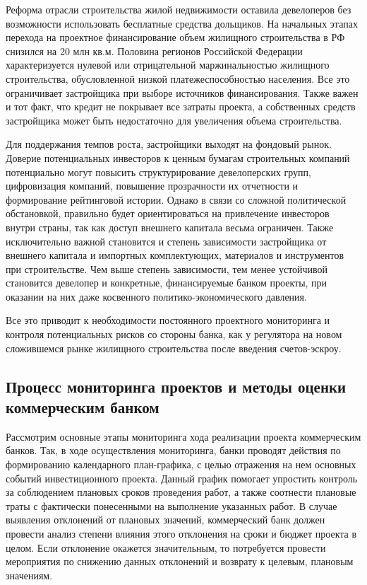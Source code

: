\documentclass[12pt,a4paper]{article} %
\begin{document}
Реформа отрасли строительства жилой недвижимости оставила девелоперов без возможности использовать бесплатные средства дольщиков. На начальных этапах перехода на проектное финансирование объем жилищного строительства в РФ снизился на 20 млн кв.м. Половина регионов Российской Федерации характеризуется нулевой или отрицательной маржинальностью жилищного строительства, обусловленной низкой платежеспособностью населения. Все это ограничивает застройщика при выборе источников финансирования. Также важен и тот факт, что кредит не покрывает все затраты проекта, а собственных средств застройщика может быть недостаточно для увеличения объема строительства. 

Для поддержания темпов роста, застройщики выходят на фондовый рынок. Доверие потенциальных инвесторов к ценным бумагам строительных компаний потенциально могут повысить структурирование девелоперских групп,  цифровизация компаний, повышение прозрачности их отчетности и формирование рейтинговой истории. Однако в связи со сложной политической обстановкой, правильно будет ориентироваться на привлечение  инвесторов внутри страны, так как доступ внешнего капитала весьма ограничен. Также исключительно важной становится и степень зависимости застройщика от внешнего капитала и импортных комплектующих, материалов и инструментов при строительстве. Чем выше степень зависимости, тем менее устойчивой становится девелопер и конкретные, финансируемые банком проекты, при оказании на них даже косвенного политико-экономического давления.

Все это приводит к необходимости постоянного проектного мониторинга и контроля потенциальных рисков со стороны банка, как у регулятора на новом сложившемся рынке жилищного строительства после введения счетов-эскроу.
  

\subsection{Процесс мониторинга проектов и методы оценки коммерческим банком}

Рассмотрим основные этапы мониторинга хода реализации проекта коммерческим банков. Так, в ходе осуществления мониторинга, банки проводят действия по формированию календарного план-графика, с целью отражения на нем основных событий инвестиционного проекта. Данный график помогает упростить контроль за соблюдением плановых сроков проведения работ, а также соотнести плановые траты с фактически понесенными на выполнение указанных работ. В случае выявления отклонений от плановых значений, коммерческий банк должен провести анализ степени влияния этого отклонения на сроки и бюджет проекта в целом. Если отклонение окажется значительным, то потребуется провести мероприятия по снижению данных отклонений и возврату к целевым, плановым значениям.
 
\end{document}
